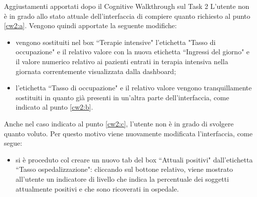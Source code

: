 \begin{bclogo}{Aggiustamenti apportati dopo il Cognitive Walkthrough sul Task 2}
    L'utente non è in grado allo stato attuale dell'interfaccia di compiere quanto richiesto al punto \ref{cw2:a}.
    Vengono quindi apportate la seguente modifiche:
    \begin{itemize}
        \item vengono sostituiti nel box ``Terapie intensive" l'etichetta "Tasso di occupazione" e il relativo valore con la nuova etichetta ``Ingressi del giorno" e il valore numerico relativo ai pazienti entrati in terapia intensiva nella giornata correntemente visualizzata dalla dashboard;
        \item l'etichetta ``Tasso di occupazione" e il relativo valore vengono tranquillamente sostituiti in quanto già presenti in un'altra parte dell'interfaccia, come indicato al punto \ref{cw2:b}.
    \end{itemize}
    Anche nel caso indicato al punto \ref{cw2:c}, l'utente non è in grado di svolgere quanto voluto.
    Per questo motivo viene nuovamente modificata l'interfaccia, come segue:
    \begin{itemize}
        \item si è proceduto col creare un nuovo tab del box ``Attuali positivi" dall'etichetta ``Tasso ospedalizzazione": cliccando sul bottone relativo, viene mostrato all'utente un indicatore di livello che indica la percentuale dei soggetti attualmente positivi e che sono ricoverati in ospedale.
    \end{itemize}
\end{bclogo}